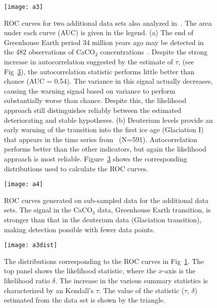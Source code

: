\documentclass[authoryear, preprint,review,12pt]{elsarticle}
\begin{document}
\begin{figure}[ht]
  \begin{center}
    \texttt{[image: a3]}
  \end{center}
  \caption{ROC curves for two additional data sets also analyzed in~\citet{Dakos2008}.  The area under each curve (AUC) is given in the legend. (a) The end of Greenhouse Earth period 34 million years ago may be detected in the 482 observations of CaCO$_3$ concentrations~\citep{Tripati2005}.   Despite the strong increase in autocorrelation suggested by the estimate of $\tau$, (see Fig~\ref{fig:a3dist}), the autocorrelation statistic performs little better than chance (AUC = 0.54). The variance in this signal actually decreases, causing the warning signal based on variance to perform substantially worse than chance.  Despite this, the likelihood approach still distinguishes reliably between the estimated deteriorating and stable hypotheses.  (b) Deuterium levels provide an early warning of the transition into the first ice age (Glaciation I) that appears in the time series from~\citep{Petit1999} (N=591).  Autocorrelation performs better than the other indicators, but again the likelihood approach is most reliable.  Figure~\ref{fig:a3dist} shows the corresponding distributions used to calculate the ROC curves.}
  \label{fig:a3}
\end{figure}

\begin{figure}[ht]
  \begin{center}
    \texttt{[image: a4]}
  \end{center}
  \caption{ROC curves generated on sub-sampled data for the additional data sets.  The signal in the CaCO$_3$ data, Greenhouse Earth transition, is stronger than that in the deuterium data (Glaciation transition), making detection possible with fewer data points.}
  \label{fig:a4}
\end{figure}


\begin{figure}[ht]
  \begin{center}
    \texttt{[image: a3dist]}
  \end{center}
  \caption{The distributions corresponding to the ROC curves in Fig~\ref{fig:a3}. The top panel shows the likelihood statistic, where the $x$-axis is the likelihood ratio $\delta$.  The increase in the various summary statistics is characterized by an Kendall's $\tau$.  The value of the statistic ($\tau$, $\delta$) estimated from the data set is shown by the triangle.   }
  \label{fig:a3dist}
\end{figure}


\section*{ }%

\end{document}
